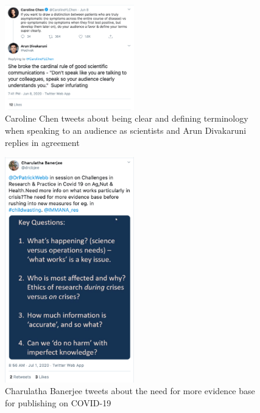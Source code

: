 \documentclass[acmsmall,authordraft]{acmart}
\begin{document}
\begin{figure}
  \includegraphics[width=0.5\textwidth]{Pictures/Appendix_Tweets/caroline chen and arun divakaruni tweet.png}
  \caption{Caroline Chen tweets about being clear and defining terminology when speaking to an audience as scientists and Arun Divakaruni replies in agreement}
  \label{caroline_chen_tweet}
\end{figure}

\begin{figure}
  \includegraphics[width=0.5\textwidth]{Pictures/Appendix_Tweets/charulatha banerjee tweet.png}
  \caption{Charulatha Banerjee tweets about the need for more evidence base for publishing on COVID-19}
  \label{charulatha_banerjee_tweet}
\end{figure}
\end{document}
